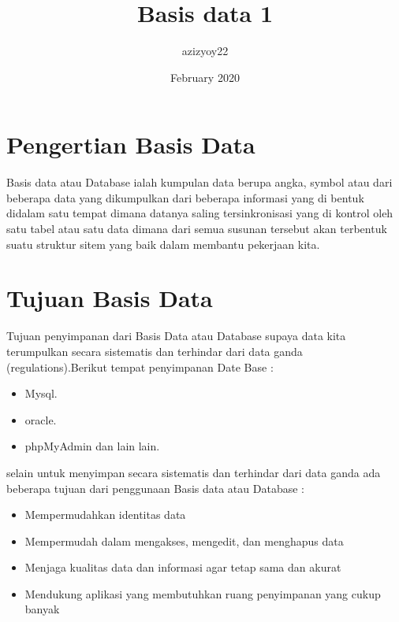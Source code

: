 \documentclass{article}
\title{Basis data 1}
\author{azizyoy22 }
\date{February 2020}
\begin{document}
\maketitle

\section{Pengertian Basis Data}
Basis data  atau Database ialah kumpulan data berupa angka, symbol atau dari beberapa data  yang dikumpulkan dari beberapa informasi yang di bentuk  didalam satu tempat dimana datanya saling tersinkronisasi yang di kontrol oleh satu tabel atau satu data dimana dari semua susunan tersebut akan terbentuk suatu struktur sitem yang baik dalam membantu pekerjaan kita.

\section{Tujuan Basis Data}

Tujuan penyimpanan dari  Basis Data  atau Database supaya data kita terumpulkan secara sistematis dan terhindar dari data ganda (regulations).Berikut tempat penyimpanan Date Base :
\begin{itemize}
  \item Mysql.
  \item oracle.
  \item phpMyAdmin dan lain lain.
\end{itemize}
selain untuk menyimpan secara sistematis dan terhindar dari data ganda ada beberapa tujuan dari penggunaan Basis data atau Database :
\begin{itemize}
    \item Mempermudahkan identitas data
    \item Mempermudah dalam mengakses, mengedit, dan menghapus data
    \item Menjaga kualitas data dan informasi agar tetap sama dan akurat
    \item Mendukung aplikasi yang membutuhkan ruang penyimpanan yang cukup banyak
\end{itemize}
\end{document}
